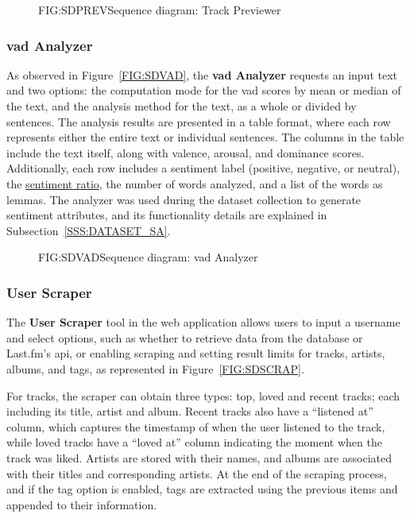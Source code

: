 \begin{figure}[Sequence diagram: Track Previewer]{FIG:SDPREV}{Sequence diagram: Track Previewer}
\end{figure}

\subsubsection{\acs{vad} Analyzer}

As observed in Figure~\ref{FIG:SDVAD}, the \textbf{\ac{vad} Analyzer} requests an input text and two options: the computation mode for the \acs{vad} scores by mean or median of the text, and the analysis method for the text, as a whole or divided by sentences. The analysis results are presented in a table format, where each row represents either the entire text or individual sentences. The columns in the table include the text itself, along with valence, arousal, and dominance scores. Additionally, each row includes a sentiment label (positive, negative, or neutral), the \hyperref[EQ:StRatio]{sentiment ratio}, the number of words analyzed, and a list of the words as lemmas. The analyzer was used during the dataset collection to generate sentiment attributes, and its functionality details are explained in Subsection~\ref{SSS:DATASET_SA}.

\begin{figure}[Sequence diagram: VAD Analyzer]{FIG:SDVAD}{Sequence diagram: \acs{vad} Analyzer}
\end{figure}

\subsubsection{User Scraper}

The \textbf{User Scraper} tool in the web application allows users to input a username and select options, such as whether to retrieve data from the database or Last.fm's \acs{api}, or enabling scraping and setting result limits for tracks, artists, albums, and tags, as represented in Figure~\ref{FIG:SDSCRAP}.

For tracks, the scraper can obtain three types: top, loved and recent tracks; each including its title, artist and album. Recent tracks also have a ``listened at'' column, which captures the timestamp of when the user listened to the track, while loved tracks have a ``loved at'' column indicating the moment when the track was liked. Artists are stored with their names, and albums are associated with their titles and corresponding artists. At the end of the scraping process, and if the tag option is enabled, tags are extracted using the previous items and appended to their information.


